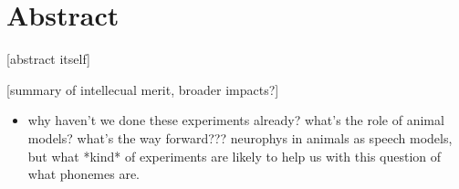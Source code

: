 

% 

\section{Abstract}

[abstract itself]

[summary of intellecual merit, broader impacts?]

\begin{itemize}
\item why haven't we done these experiments already? what's the role of animal models? what's the way forward??? neurophys in animals as speech models, but what *kind* of experiments are likely to help us with this question of what phonemes are.
\end{itemize}


% 

